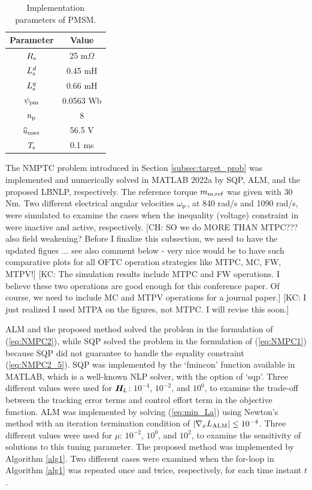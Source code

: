 \documentclass[journal]{IEEEtranTIE}
\newcommand{\CHHA}[1]{{\color{red} [CH: #1]}} %
\newcommand{\KYCH}[1]{{\color{blue} [KC: #1]}} %
\begin{document}
\begin{table}
\caption{Implementation parameters of PMSM.}\label{tab:Comparison of LBNLP, SQP and ALM}
\centering
{\begin{tabular}{cc}\hline
Parameter & Value \\\hline\hline
\rowcolor{lightgray}
$R_{\mathrm{s}}$ & 25 m$\Omega$\\
$L_{\mathrm{s}}^{d}$ & 0.45 mH\\
\rowcolor{lightgray}
$L_{\mathrm{s}}^{q}$ & 0.66 mH\\
$\psi_{\mathrm{pm}}$ & 0.0563 Wb\\
\rowcolor{lightgray}
$n_{\mathrm{p}}$ & 8\\
$\widehat{u}_{\max}$ & 56.5 V \\
\rowcolor{lightgray}
$T_{\mathrm{s}}$ & 0.1 ms \\\hline
\end{tabular}}
\end{table}



The NMPTC problem introduced in Section \ref{subsec:target_prob} was implemented and numerically solved in MATLAB 2022a by SQP, ALM, and the proposed LBNLP, respectively. The reference torque $m_{\mathrm{m},\mathrm{ref}}$ was given with 30 Nm. Two different electrical angular velocities $\omega_{\mathrm{p}}$, at 840 rad/s and 1090 rad/s, were simulated to examine the cases when the inequality (voltage) constraint in were inactive and active, respectively. \CHHA{SO we do MORE THAN MTPC??? also field weakening? Before I finalize this subsection, we need to have the updated figues ... see also comment below - very nice would be to have such comparative plots for all OFTC operation strategies like MTPC, MC, FW, MTPV!}
\KYCH{The simulation results include MTPC and FW operations. I believe these two operations are good enough for this conference paper. Of course, we need to include MC and MTPV operations for a journal paper.}
\KYCH{I just realized I used MTPA on the figures, not MTPC. I will revise this soon.}

ALM and the proposed method solved the problem in the formulation of (\ref{eq:NMPC2}), while SQP solved the problem in the formulation of (\ref{eq:NMPC1}) because SQP did not guarantee to handle the equality constraint (\ref{eq:NMPC2_5}). SQP was implemented by the `fmincon' function available in MATLAB, which is a well-known NLP solver, with the option of `sqp'. Three different values were used for $\boldsymbol{H}_{\!L}$: $10^{-4}$, $10^{-2}$, and $10^{0}$, to examine the trade-off between the tracking error terms and control effort term in the objective function. ALM was implemented by solving (\ref{eq:min_La}) using Newton's method with an iteration termination condition of $\left| \nabla_x L_{\rm ALM} \right| \le 10^{-4}$. Three different values were used for $\mu$: $10^{-2}$, $10^{0}$, and $10^{2}$, to examine the sensitivity of solutions to this tuning parameter. The proposed method was implemented by Algorithm \ref{alg1}. Two different cases were examined when the for-loop in Algorithm \ref{alg1} was repeated once and twice, respectively, for each time instant $t$.
\end{document}
